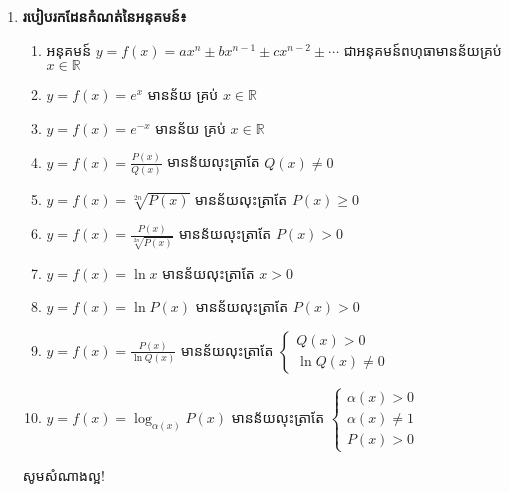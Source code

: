 \documentclass[12pt, a4paper]{article}
\begin{document}
\begin{enumerate}[m]
	\item \textbf{\sffamily របៀបរកដែនកំណត់នៃអនុគមន៍៖}
	\begin{enumerate}[k]
		\item អនុគមន៍ $y=f(x)=ax^n\pm bx^{n-1}\pm cx^{n-2}\pm\cdots$ ជាអនុគមន៍ពហុធាមានន័យគ្រប់ $x\in\mathbb{R}$
		\item $y=f(x)=e^x$ មានន័យ គ្រប់ $x\in\mathbb{R}$
		\item $y=f(x)=e^{-x}$ មានន័យ គ្រប់ $x\in\mathbb{R}$
		\item $y=f(x)=\frac{P(x)}{Q(x)}$ មានន័យលុះត្រាតែ $Q(x)\neq0$
		\item $y=f(x)=\sqrt[2n]{P(x)}$ មានន័យលុះត្រាតែ $P(x)\geq0$
		\item $y=f(x)=\frac{P(x)}{\sqrt[2n]{P(x)}}$ មានន័យលុះត្រាតែ $P(x)>0$
		\item $y=f(x)=\ln x$ មានន័យលុះត្រាតែ $x>0$
		\item $y=f(x)=\ln P(x)$ មានន័យលុះត្រាតែ $P(x)>0$
		\item $y=f(x)=\frac{P(x)}{\ln Q(x)}$ មានន័យលុះត្រាតែ 
		$\begin{cases}
			\text{$Q(x)>0$}\\
			\text{$\ln Q(x)\neq0$}	
		\end{cases}$
		\item $y=f(x)=\log_{\alpha(x)}P(x)$ មានន័យលុះត្រាតែ 
		$\begin{cases}
			\text{$\alpha(x)>0$}\\
			\text{$\alpha(x)\neq1$}\\
			\text{$P(x)>0$}
		\end{cases}$		
	\end{enumerate}
	\begin{center}
		\sffamily\color{black}
		សូមសំណាងល្អ!
	\end{center}
\end{enumerate}
\end{document}

